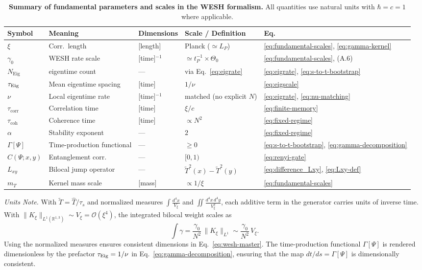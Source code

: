 \documentclass[12pt,a4paper]{article}
\newcommand{\Ttil}{\tilde T}      %
\newcommand{\Vxi}{V_\xi}          %
\newcommand{\intx}{\int \frac{d^4x}{\Vxi}}
\newcommand{\intxy}{\iint \frac{d^4x\,d^4y}{\Vxi^2}}
\numberwithin{equation}{section}
\begin{document}
\begin{table}[H]
\centering
\caption{\textbf{Summary of fundamental parameters and scales in the WESH formalism.} All quantities use natural units with $\hbar=c=1$ where applicable.}
\label{tab:parameters}
\footnotesize
\setlength{\tabcolsep}{4pt}
\renewcommand{\arraystretch}{1.10}
\begin{tabularx}{\linewidth}{l Y Y Y l}
\toprule
\textbf{Symbol} & \textbf{Meaning} & \textbf{Dimensions} & \textbf{Scale / Definition} & \textbf{Eq.} \\
\midrule
$\xi$ &  Corr.\ length & [length] & Planck ($\simeq L_P$) & \eqref{eq:fundamental-scales}, \eqref{eq:gamma-kernel} \\
$\gamma_0$  & WESH rate scale & [time]$^{-1}$ &
$\simeq t_P^{-1}\!\times\!\Theta_0$ &
\eqref{eq:fundamental-scales}, (A.6) \\
$N_{\mathrm{Eig}}$ & eigentime count & --- &
via Eq.~\eqref{eq:eigrate} &
\eqref{eq:eigrate}, \eqref{eq:s-to-t-bootstrap} \\
$\tau_{\rm Eig}$  & Mean eigentime spacing & [time] & $1/\nu$ &
\eqref{eq:eigscale} \\
$\nu$ & Local eigentime rate & [time]$^{-1}$ &
matched (no explicit $N$) &
\eqref{eq:eigrate}, \eqref{eq:nu-matching} \\
$\tau_{\mathrm{corr}}$ & Correlation time & [time] & $\xi/c$ &
\eqref{eq:finite-memory} \\
$\tau_{\mathrm{coh}}$ & Coherence time & [time] & $\propto N^{2}$ &
\eqref{eq:fixed-regime} \\
$\alpha$ & Stability exponent & --- & $2$ &
\eqref{eq:fixed-regime} \\
$\Gamma[\Psi]$ & Time-production functional & --- &
$\ge 0$ & \eqref{eq:s-to-t-bootstrap}, \eqref{eq:gamma-decomposition} \\
$C(\Psi;x,y)$ & Entanglement corr.\ & --- & $[0,1)$ &
\eqref{eq:renyi-gate} \\
$L_{xy}$ & Bilocal jump operator & --- & $\tilde{T}^2(x)-\tilde{T}^2(y)$ &
\eqref{eq:difference_Lxy}, \eqref{eq:Lxy-def} \\
$m_T$ & Kernel mass scale & [mass] & $\propto 1/\xi$ &
\eqref{eq:fundamental-scales} \\
\bottomrule
\end{tabularx}
\vspace{0.3cm}
\parbox{\linewidth}{\footnotesize 
\noindent\emph{Units Note.} With $\Ttil=\hat T/\tau_s$ and normalized measures
$\intx$ and $\intxy$, each additive term in the generator carries units
of inverse time. With $\|K_\xi\|_{L^1(\mathbb{R}^{1,3})}\sim V_\xi=\mathcal O(\xi^4)$,
the integrated bilocal weight scales as 
\[
\int\!\gamma=\frac{\gamma_0}{N^2}\,\|K_\xi\|_{L^1}\sim\frac{\gamma_0}{N^2}\,V_\xi.
\] Using the
normalized measures ensures consistent dimensions in Eq.~\eqref{eq:wesh-master}. 
The time-production functional $\Gamma[\Psi]$ is rendered dimensionless by the prefactor
$\tau_{\rm Eig}=1/\nu$ in Eq.~\eqref{eq:gamma-decomposition}, ensuring that
the map $dt/ds=\Gamma[\Psi]$ is dimensionally consistent.
}
\end{table}
\end{document}
